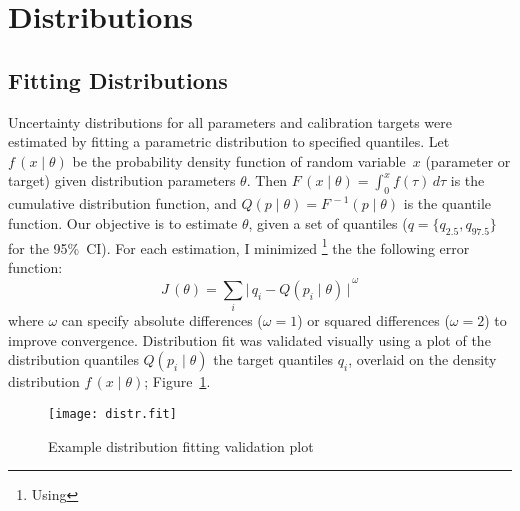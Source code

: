 \section{Distributions}\label{app.math.distr}
\subsection{Fitting Distributions}\label{app.math.distr.fit}
Uncertainty distributions for all parameters and calibration targets were estimated by
fitting a parametric distribution to specified quantiles.
Let $f\,(x\mid\theta)$ be
the probability density function of random variable~$x$ (parameter or target)
given distribution parameters $\theta$.
Then $F\,(x\mid\theta) = \int_0^x f(\tau)\,d\tau$ is the cumulative distribution function,
and $Q(p\mid\theta) = F^{\,-1}(p\mid\theta)$ is the quantile function.
Our objective is to estimate $\theta$, given a set of quantiles
(\eg $q = \{q_{2.5},q_{97.5}\}$ for the 95\%~CI).
For each estimation, I minimized%
\footnote{Using }
the the following error function:
\begin{equation}
  J\,(\theta) = \sum_i {\big|\,q_i - Q(p_i\mid\theta)\,\big|}^{\,\omega}
\end{equation}
where $\omega$ can specify absolute differences ($\omega=1$) or squared differences ($\omega=2$)
to improve convergence.
Distribution fit was validated visually using a plot of
the distribution quantiles $Q(p_i\mid\theta)$ \vs the target quantiles $q_i$,
overlaid on the density distribution $f\,(x\mid\theta)$; \eg Figure~\ref{fig:distr.fit}.
\begin{figure}[h]
  \centering
  \texttt{[image: distr.fit]}
  \caption{Example distribution fitting validation plot}
  \label{fig:distr.fit}
\end{figure}
